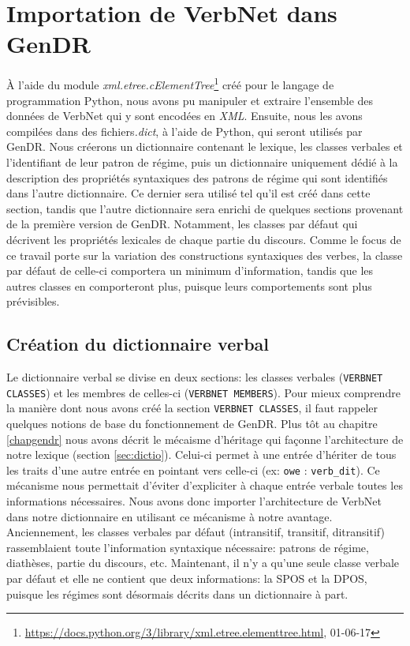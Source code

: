 \chapter{Importation de VerbNet dans GenDR}\label{ch:python}

À l'aide du module \emph{xml.etree.cElementTree}\footnote{\url{https://docs.python.org/3/library/xml.etree.elementtree.html}, 01-06-17} créé pour le langage de programmation Python, nous avons pu manipuler et extraire l'ensemble des données de VerbNet qui y sont encodées en \emph{XML}. Ensuite, nous les avons compilées dans des fichiers\emph{.dict}, à l'aide de Python, qui seront utilisés par GenDR. Nous créerons un dictionnaire contenant le lexique, les classes verbales et l'identifiant de leur patron de régime, puis un dictionnaire uniquement dédié à la description des propriétés syntaxiques des patrons de régime qui sont identifiés dans l'autre dictionnaire. Ce dernier sera utilisé tel qu'il est créé dans cette section, tandis que l'autre dictionnaire sera enrichi de quelques sections provenant de la première version de GenDR. Notamment, les classes par défaut qui décrivent les propriétés lexicales de chaque partie du discours. Comme le focus de ce travail porte sur la variation des constructions syntaxiques des verbes, la classe par défaut de celle-ci comportera un minimum d'information, tandis que les autres classes en comporteront plus, puisque leurs comportements sont plus prévisibles.
 
\section{Création du dictionnaire verbal}

Le dictionnaire verbal se divise en deux sections: les classes verbales (\texttt{VERBNET CLASSES}) et les membres de celles-ci (\texttt{VERBNET MEMBERS}). Pour mieux comprendre la manière dont nous avons créé la section \texttt{VERBNET CLASSES}, il faut rappeler quelques notions de base du fonctionnement de GenDR. Plus tôt au chapitre \ref{chapgendr} nous avons décrit le mécaisme d'héritage qui façonne l'architecture de notre lexique (section \ref{sec:dictio}). Celui-ci permet à une entrée d'hériter de tous les traits d'une autre entrée en pointant vers celle-ci (ex: \texttt{owe} : \texttt{verb\_dit}). Ce mécanisme nous permettait d'éviter d'expliciter à chaque entrée verbale toutes les informations nécessaires. Nous avons donc importer l'architecture de VerbNet dans notre dictionnaire en utilisant ce mécanisme à notre avantage. Anciennement, les classes verbales par défaut (intransitif, transitif, ditransitif) rassemblaient toute l'information syntaxique nécessaire: patrons de régime, diathèses, partie du discours, etc. Maintenant, il n'y a qu'une seule classe verbale par défaut et elle ne contient que deux informations: la \ac{SPOS} et la \ac{DPOS}, puisque les régimes sont désormais décrits dans un dictionnaire à part.

